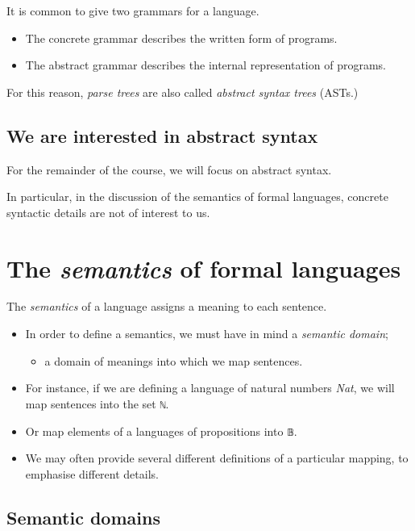 \documentclass[11pt]{article}
\theoremstyle{definition}
\begin{document}
It is common to give two grammars for a language.
\begin{itemize}
\item The concrete grammar describes the written form of programs.
\item The abstract grammar describes the internal representation of programs.
\end{itemize}

For this reason, \emph{parse trees} are also called \emph{abstract syntax trees} (ASTs.)

\subsection{We are interested in abstract syntax}
\label{sec:orga8a2924}

For the remainder of the course, we will focus on abstract syntax.

In particular, in the discussion of the semantics of formal languages,
concrete syntactic details are not of interest to us.

\section{The \emph{semantics} of formal languages}
\label{sec:org858dcd4}
The \emph{semantics} of a language assigns a meaning to each sentence.
\begin{itemize}
\item In order to define a semantics, we must
have in mind a \emph{semantic domain};
\begin{itemize}
\item a domain of meanings into which we map sentences.
\end{itemize}
\item For instance, if we are defining a language
of natural numbers \emph{Nat}, we will map sentences into the set \texttt{ℕ}.
\item Or map elements of a languages of propositions into \texttt{𝔹}.
\item We may often provide several different definitions of
a particular mapping, to emphasise different details.
\end{itemize}

\subsection{Semantic domains}
\label{sec:org1b5b75d}
\end{document}
